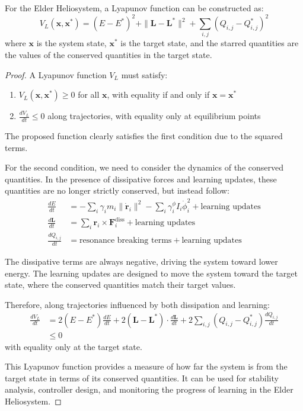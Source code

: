 \begin{theorem}
For the Elder Heliosystem, a Lyapunov function can be constructed as:
\begin{equation}
V_L(\mathbf{x}, \mathbf{x}^*) = (E - E^*)^2 + \|\mathbf{L} - \mathbf{L}^*\|^2 + \sum_{i,j} (Q_{i,j} - Q_{i,j}^*)^2
\end{equation}
where $\mathbf{x}$ is the system state, $\mathbf{x}^*$ is the target state, and the starred quantities are the values of the conserved quantities in the target state.
\end{theorem}

\begin{proof}
A Lyapunov function $V_L$ must satisfy:
\begin{enumerate}
    \item $V_L(\mathbf{x}, \mathbf{x}^*) \geq 0$ for all $\mathbf{x}$, with equality if and only if $\mathbf{x} = \mathbf{x}^*$
    \item $\frac{dV_L}{dt} \leq 0$ along trajectories, with equality only at equilibrium points
\end{enumerate}

The proposed function clearly satisfies the first condition due to the squared terms.

For the second condition, we need to consider the dynamics of the conserved quantities. In the presence of dissipative forces and learning updates, these quantities are no longer strictly conserved, but instead follow:
\begin{align}
\frac{dE}{dt} &= -\sum_i \gamma_i m_i \|\dot{\mathbf{r}}_i\|^2 - \sum_i \gamma_i^{\phi} I_i \dot{\phi}_i^2 + \text{learning updates} \\
\frac{d\mathbf{L}}{dt} &= \sum_i \mathbf{r}_i \times \mathbf{F}_i^{\text{diss}} + \text{learning updates} \\
\frac{dQ_{i,j}}{dt} &= \text{resonance breaking terms} + \text{learning updates}
\end{align}

The dissipative terms are always negative, driving the system toward lower energy. The learning updates are designed to move the system toward the target state, where the conserved quantities match their target values.

Therefore, along trajectories influenced by both dissipation and learning:
\begin{align}
\frac{dV_L}{dt} &= 2(E - E^*)\frac{dE}{dt} + 2(\mathbf{L} - \mathbf{L}^*) \cdot \frac{d\mathbf{L}}{dt} + 2\sum_{i,j} (Q_{i,j} - Q_{i,j}^*)\frac{dQ_{i,j}}{dt} \\
&\leq 0
\end{align}
with equality only at the target state.

This Lyapunov function provides a measure of how far the system is from the target state in terms of its conserved quantities. It can be used for stability analysis, controller design, and monitoring the progress of learning in the Elder Heliosystem.
\end{proof}

